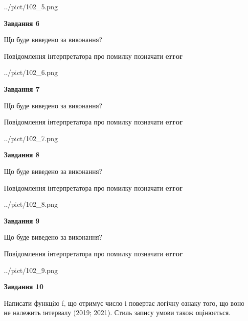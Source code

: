 \documentclass[12pt, ukrainian]{article}
\begin{document}
{\begin {large}
\begin{center}
	{../pict/102_5.png}
\end{center}
\newpage

{\begin {center}\textbf{Завдання 6}\end {center}}\par
Що буде виведено за виконання? \par
Повідомлення інтерпретатора про помилку позначати \textbf{error}

\begin{center}
	{../pict/102_6.png}
\end{center}
\newpage

{\begin {center}\textbf{Завдання 7}\end {center}}\par
Що буде виведено за виконання? \par
Повідомлення інтерпретатора про помилку позначати \textbf{error}

\begin{center}
	{../pict/102_7.png}
\end{center}
\newpage

{\begin {center}\textbf{Завдання 8}\end {center}}\par
Що буде виведено за виконання? \par
Повідомлення інтерпретатора про помилку позначати \textbf{error}

\begin{center}
	{../pict/102_8.png}
\end{center}
\newpage

{\begin {center}\textbf{Завдання 9}\end {center}}\par
Що буде виведено за виконання? \par
Повідомлення інтерпретатора про помилку позначати \textbf{error}

\begin{center}
	{../pict/102_9.png}
\end{center}
\newpage

{\begin {center}\textbf{Завдання 10}\end {center}}\par

Написати функцiю f, що отримує число і повертає логічну ознаку того, що воно не належить iнтервалу (2019; 2021). Стиль запису умови також оцінюється.\par
\newpage

\end {large}}
\end{document}
